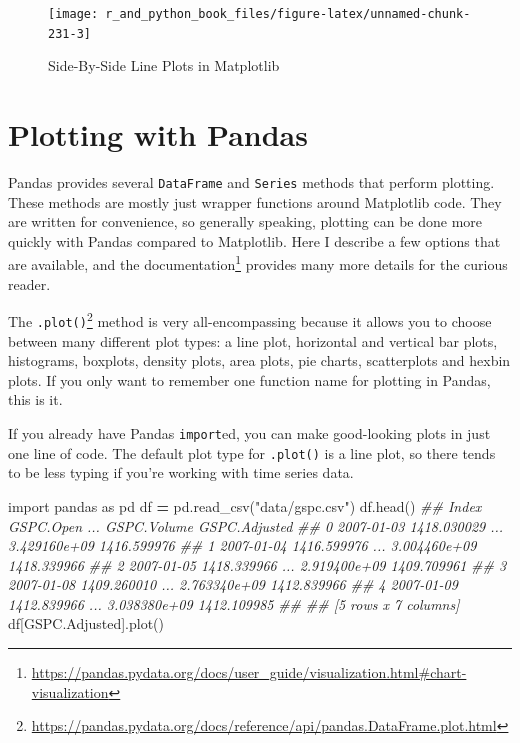 \documentclass[
  12pt,
  krantz2]{krantz}
\makeatletter
\newenvironment{Shaded}{\begin{snugshade}}{\end{snugshade}}
\newcommand{\CommentTok}[1]{\textcolor[rgb]{0.37,0.37,0.37}{\textit{#1}}}
\newcommand{\ImportTok}[1]{#1}
\newcommand{\NormalTok}[1]{#1}
\newcommand{\OperatorTok}[1]{\textcolor[rgb]{0.43,0.43,0.43}{\textbf{#1}}}
\newcommand{\StringTok}[1]{\textcolor[rgb]{0.5,0.5,0.5}{#1}}
\renewcommand{\href}[2]{#2\footnote{\url{#1}}}
\newenvironment{kframe}{%
\medskip{}
\setlength{\fboxsep}{.8em}
 \def\at@end@of@kframe{}%
 \ifinner\ifhmode%
  \def\at@end@of@kframe{\end{minipage}}%
  \begin{minipage}{\columnwidth}%
 \fi\fi%
 \def\FrameCommand##1{\hskip\@totalleftmargin \hskip-\fboxsep
 \colorbox{shadecolor}{##1}\hskip-\fboxsep
     \hskip-\linewidth \hskip-\@totalleftmargin \hskip\columnwidth}%
 \MakeFramed {\advance\hsize-\width
   \@totalleftmargin\z@ \linewidth\hsize
   \@setminipage}}%
 {\par\unskip\endMakeFramed%
 \at@end@of@kframe}
\renewenvironment{Shaded}{\begin{kframe}}{\end{kframe}}
\makeatother
\begin{document}
\begin{figure}
\texttt{[image: r\_and\_python\_book\_files/figure-latex/unnamed-chunk-231-3]} \caption{Side-By-Side Line Plots in Matplotlib}\label{fig:unnamed-chunk-231}
\end{figure}

\hypertarget{plotting-with-pandas}{%
\section{Plotting with Pandas}\label{plotting-with-pandas}}

Pandas provides several \texttt{DataFrame} and \texttt{Series} methods that perform plotting. These methods are mostly just wrapper functions around Matplotlib code. They are written for convenience, so generally speaking, plotting can be done more quickly with Pandas compared to Matplotlib. Here I describe a few options that are available, and \href{https://pandas.pydata.org/docs/user_guide/visualization.html\#chart-visualization}{the documentation} provides many more details for the curious reader.

The \href{https://pandas.pydata.org/docs/reference/api/pandas.DataFrame.plot.html}{\texttt{.plot()}} method is very all-encompassing because it allows you to choose between many different plot types: a line plot, horizontal and vertical bar plots, histograms, boxplots, density plots, area plots, pie charts, scatterplots and hexbin plots. If you only want to remember one function name for plotting in Pandas, this is it.

If you already have Pandas \texttt{import}ed, you can make good-looking plots in just one line of code. The default plot type for \texttt{.plot()} is a line plot, so there tends to be less typing if you're working with time series data.

\begin{Shaded}
\begin{Highlighting}[]
\ImportTok{import}\NormalTok{ pandas }\ImportTok{as}\NormalTok{ pd}
\NormalTok{df }\OperatorTok{=}\NormalTok{ pd.read\_csv(}\StringTok{"data/gspc.csv"}\NormalTok{)}
\NormalTok{df.head()}
\CommentTok{\#\#         Index    GSPC.Open  ...   GSPC.Volume  GSPC.Adjusted}
\CommentTok{\#\# 0  2007{-}01{-}03  1418.030029  ...  3.429160e+09    1416.599976}
\CommentTok{\#\# 1  2007{-}01{-}04  1416.599976  ...  3.004460e+09    1418.339966}
\CommentTok{\#\# 2  2007{-}01{-}05  1418.339966  ...  2.919400e+09    1409.709961}
\CommentTok{\#\# 3  2007{-}01{-}08  1409.260010  ...  2.763340e+09    1412.839966}
\CommentTok{\#\# 4  2007{-}01{-}09  1412.839966  ...  3.038380e+09    1412.109985}
\CommentTok{\#\# }
\CommentTok{\#\# [5 rows x 7 columns]}
\NormalTok{df[}\StringTok{\textquotesingle{}GSPC.Adjusted\textquotesingle{}}\NormalTok{].plot()}
\end{Highlighting}
\end{Shaded}
\end{document}
